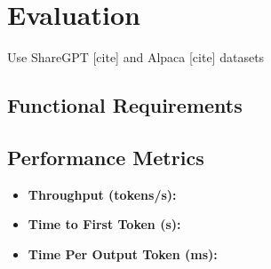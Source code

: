 \documentclass[12pt,twoside]{report}
\begin{document}
\begin{comment}
\chapter{Project Plan} %
\begin{itemize}
  \item \textbf{Confirming project direction (three weeks):} At present, it seems likely that we will try and improve the state of existing LLM runtimes by building upon llama.cpp 
  \item \textbf{:}
  \item \textbf{Evaluation (two weeks):} 
  \item \textbf{Project report (three weeks):} 
\end{itemize}
\end{comment}


\chapter{Evaluation} %
\begin{comment}
1. Run some benchmark on llama.cpp
2. Run same benchmark on llama.cpp + my system
3. ...
4. Profit???

Key requirements for project

Areas on which I could track performance relative to existing system
- Efficiency (\% of overall resources used)
- Throughput (tokens/sec)

\end{comment}

Use ShareGPT [cite] and Alpaca [cite] datasets

\section{Functional Requirements}
\section{Performance Metrics}
\begin{itemize}
  \item \textbf{Throughput (tokens/s):}
  \item \textbf{Time to First Token (s):}
  \item \textbf{Time Per Output Token (ms):}
\end{itemize}
\end{document}
